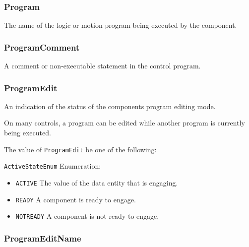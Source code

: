 \subsubsection{Program}
\label{sec:Program}



The name of the logic or motion program being executed by the  component.



\subsubsection{ProgramComment}
\label{sec:ProgramComment}



A comment or non-executable statement in the control program.



\subsubsection{ProgramEdit}
\label{sec:ProgramEdit}



An indication of the status of the  components program editing mode. 

On many controls, a program can be edited while another program is currently being executed.


The value of \texttt{ProgramEdit} \MUST be one of the following: 


\texttt{ActiveStateEnum} Enumeration:

\begin{itemize}
\item \texttt{ACTIVE} \newline The value of the \gls{data entity} that is engaging. 
\item \texttt{READY} \newline A component is ready to engage. 
\item \texttt{NOT\textunderscore READY} \newline A component is not ready to engage. 
\end{itemize}



\subsubsection{ProgramEditName}
\label{sec:ProgramEditName}



